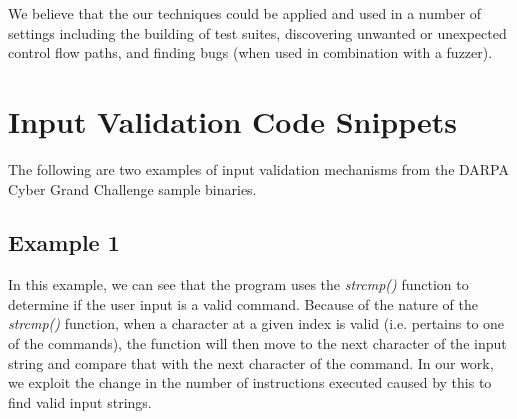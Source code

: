 \documentclass{acm_proc_article-sp}
\begin{document}
We believe that the our techniques could be applied and used in a number of settings including the building of test suites, discovering unwanted or unexpected control flow paths, and  finding bugs (when used in combination with a fuzzer).





\appendix
\section{Input Validation Code Snippets}
The following are two examples of input validation mechanisms from the DARPA Cyber Grand Challenge sample binaries.

\subsection{Example 1}

In this example, we can see that the program uses the \textit{strcmp()} function to determine if the user input is a valid command.
Because of the nature of the \textit{strcmp()} function, when a character at a given index is valid (i.e. pertains to one of the commands), the function will then move to the next character of the input string and compare that with the next character of the command.
In our work, we exploit the change in the number of instructions executed caused by this to find valid input strings.

 
 
\end{document}
